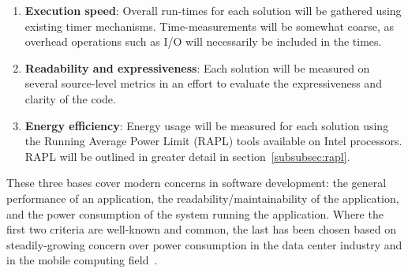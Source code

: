 \begin{enumerate}
\item \textbf{Execution speed}: Overall run-times for each solution will be gathered using existing timer mechanisms. Time-measurements will be somewhat coarse, as overhead operations such as I/O will necessarily be included in the times.
\item \textbf{Readability and expressiveness}: Each solution will be measured on several source-level metrics in an effort to evaluate the expressiveness and clarity of the code.
\item \textbf{Energy efficiency}: Energy usage will be measured for each solution using the Running Average Power Limit (RAPL) tools available on Intel processors. RAPL will be outlined in greater detail in section~\ref{subsubsec:rapl}.
\end{enumerate}

These three bases cover modern concerns in software development: the general performance of an application, the readability/maintainability of the application, and the power consumption of the system running the application. Where the first two criteria are well-known and common, the last has been chosen based on steadily-growing concern over power consumption in the data center industry and in the mobile computing field~\cite{pereira}.

